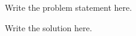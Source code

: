 \documentclass{homework}
\begin{document}
\begin{problem}
Write the problem statement here.
\end{problem}

\begin{solution}
Write the solution here.
\end{solution}
\end{document}

